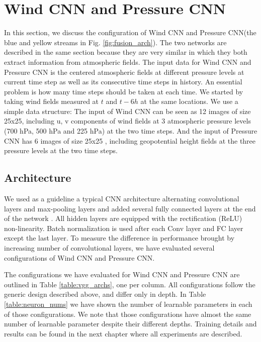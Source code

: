 \section{Wind CNN and Pressure CNN}
In this section, we discuss the configuration of Wind CNN and Pressure CNN(the blue and yellow streams in Fig. \ref{fig:fusion_arch}).
The two networks are described in the same section because they are very similar in which they both extract information from atmospheric fields. The input data for Wind CNN and Pressure CNN is the centered atmospheric fields at different pressure levels at current time step as well as its consecutive time steps in history. An essential problem is how many time steps should be taken at each time. We started by taking wind fields measured at $t$ and $t - 6h$ at the same locations. We use a simple data structure: The input of Wind CNN can be seen as 12 images of size 25x25, including u, v components of wind fields at 3 atmospheric pressure levels (700 hPa, 500 hPa and 225 hPa) at the two time steps. And the input of Pressure CNN has 6 images of size 25x25 , including geopotential height fields at the three pressure levels at the two time steps.

\subsection{Architecture}
 
  We used as a guideline a typical CNN architecture alternating convolutional layers and max-pooling layers and added several fully connected layers at the end of the network \cite{simonyan2014very}. All hidden layers are equipped with the rectification (ReLU) non-linearity. Batch normalization is used after each Conv layer and FC layer except the last layer. To measure the difference in performance brought by increasing number of convolutional layers, we have evaluated several configurations of Wind CNN and Pressure CNN. 
  
  The configurations we have evaluated for Wind CNN and Pressure CNN are outlined in Table \ref{table:vgg_archs}, one per column. All configurations follow the generic design described above, and differ only in depth. In Table \ref{table:neuron_nums} we have shown the number of learnable parameters in each of those configurations. We note that those configurations have almost the same number of learnable parameter despite their different depths. Training details and results can be found in the next chapter where all experiments are described.
 
